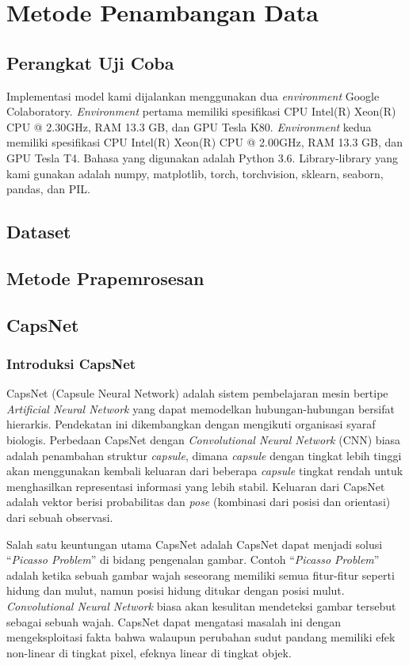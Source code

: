 \documentclass{article}
\begin{document}
   \section{Metode Penambangan Data}
    \subsection{Perangkat Uji Coba}
    Implementasi model kami dijalankan menggunakan dua \textit{environment} Google Colaboratory. \textit{Environment} pertama memiliki spesifikasi CPU Intel(R) Xeon(R) CPU @ 2.30GHz, RAM 13.3 GB, dan GPU Tesla K80. \textit{Environment} kedua memiliki spesifikasi CPU Intel(R) Xeon(R) CPU @ 2.00GHz, RAM 13.3 GB, dan GPU Tesla T4. Bahasa yang digunakan adalah Python 3.6. Library-library yang kami gunakan adalah numpy, matplotlib, torch, torchvision, sklearn, seaborn, pandas, dan PIL. 
    
    \subsection{Dataset}
    
    
    \subsection{Metode Prapemrosesan}
    \subsection{CapsNet}
	   	\subsubsection{Introduksi CapsNet}
	   	CapsNet (Capsule Neural Network) adalah sistem pembelajaran mesin bertipe \textit{Artificial Neural Network} yang dapat memodelkan hubungan-hubungan bersifat hierarkis. Pendekatan ini dikembangkan dengan mengikuti organisasi syaraf biologis. Perbedaan CapsNet dengan \textit{Convolutional Neural Network} (CNN) biasa adalah penambahan struktur \textit{capsule}, dimana \textit{capsule} dengan tingkat lebih tinggi akan menggunakan kembali keluaran dari beberapa \textit{capsule} tingkat rendah untuk menghasilkan representasi informasi yang lebih stabil. Keluaran dari CapsNet adalah vektor berisi probabilitas dan \textit{pose} (kombinasi dari posisi dan orientasi) dari sebuah observasi. 
	   	\par
	   	Salah satu keuntungan utama CapsNet adalah CapsNet dapat menjadi solusi “\textit{Picasso Problem}” di bidang pengenalan gambar. Contoh “\textit{Picasso Problem}” adalah ketika sebuah gambar wajah seseorang memiliki semua fitur-fitur seperti hidung dan mulut, namun posisi hidung ditukar dengan posisi mulut. \textit{Convolutional Neural Network} biasa akan kesulitan mendeteksi gambar tersebut sebagai sebuah wajah. CapsNet dapat mengatasi masalah ini dengan mengeksploitasi fakta bahwa walaupun perubahan sudut pandang memiliki efek non-linear di tingkat pixel, efeknya linear di tingkat objek.
	   	
\end{document}
